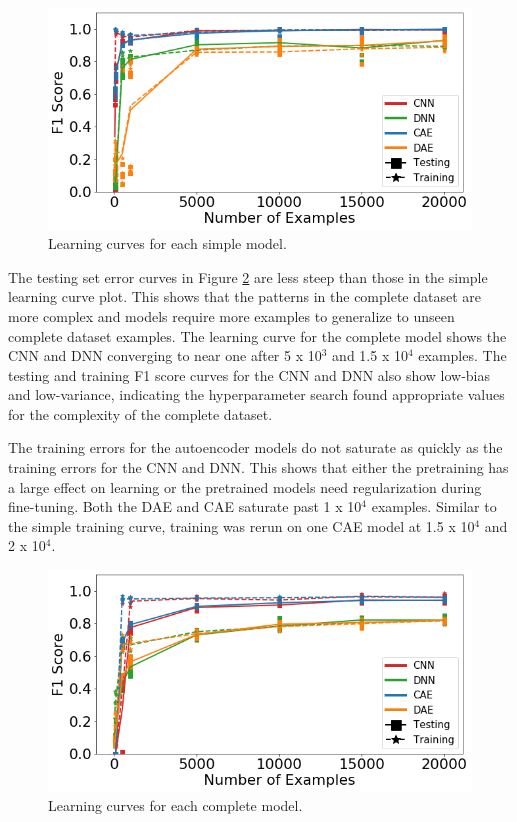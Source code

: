 \begin{figure}[H]
	\centering
	\includegraphics[width=0.9\linewidth]{images/learning_curves_easy}
	\caption{Learning curves for each simple model.}
	\label{fig:learning_curves_easy}
\end{figure}


The testing set error curves in Figure \ref{fig:learning_curves_full} are less steep than those in the simple learning curve plot. This shows that the patterns in the complete dataset are more complex and models require more examples to generalize to unseen complete dataset examples. The learning curve for the complete model shows the CNN and DNN converging to near one after 5 x 10$^{3}$ and 1.5 x 10$^{4}$ examples. The testing and training F1 score curves for the CNN and DNN also show low-bias and low-variance, indicating the hyperparameter search found appropriate values for the complexity of the complete dataset.

The training errors for the autoencoder models do not saturate as quickly as the training errors for the CNN and DNN. This shows that either the pretraining has a large effect on learning or the pretrained models need regularization during fine-tuning. Both the DAE and CAE saturate past 1 x 10$^{4}$ examples. Similar to the simple training curve, training was rerun on one CAE model at 1.5 x 10$^{4}$ and 2 x 10$^{4}$.



\begin{figure}[H]
	\centering
	\includegraphics[width=0.9\linewidth]{images/learning_curves_full}
	\caption{Learning curves for each complete model.}
	\label{fig:learning_curves_full}
\end{figure}



